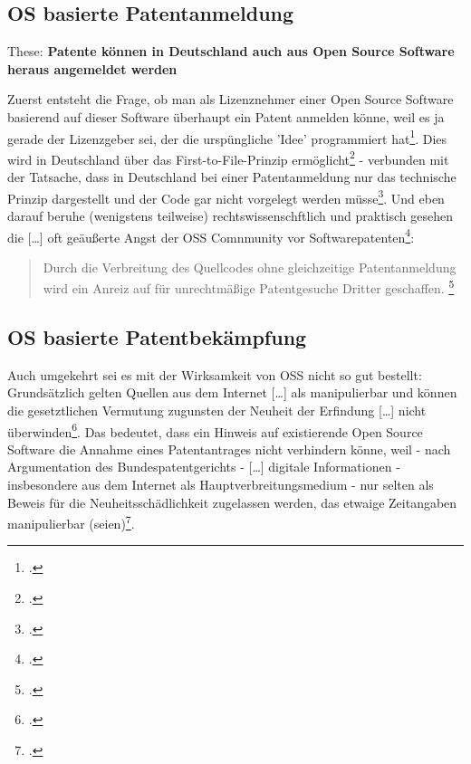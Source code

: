 \documentclass[DIV=calc,BCOR=5mm,11pt,headings=small,oneside,abstract=true, toc=bib]{scrartcl}
\begin{document}
\subsection{OS basierte Patentanmeldung}

These: \textbf{Patente können in Deutschland auch aus Open Source Software
heraus angemeldet werden}

Zuerst entsteht die Frage, ob man als Lizenznehmer einer Open Source Software
basierend auf dieser Software überhaupt ein Patent anmelden könne, weil es ja
gerade der Lizenzgeber sei, der die urspüngliche 'Idee' programmiert
hat\footcite[vgl.][21]{Suchomski2011a}. Dies wird in Deutschland über das
\glqq{}First-to-File-Prinzip\grqq{}
ermöglicht\footcite[vgl.][21]{Suchomski2011a} - verbunden mit der Tatsache, dass
in Deutschland bei einer Patentanmeldung nur das technische Prinzip dargestellt
und der Code gar nicht vorgelegt werden
müsse\footcite[vgl.][26]{Suchomski2011a}. Und eben darauf beruhe (wenigstens
teilweise) \glqq{}rechtswissenschftlich und praktisch\grqq{} gesehen die
\glqq{}[\ldots] oft geäußerte Angst der OSS Comnmunity vor
Softwarepatenten\grqq{}\footcite[vgl.][27]{Suchomski2011a}: 

\begin{quote}
\glqq{}Durch die Verbreitung des Quellcodes ohne gleichzeitige Patentanmeldung
wird ein Anreiz auf für unrechtmäßige Patentgesuche Dritter geschaffen.
\grqq{}\footcite[vgl.][27]{Suchomski2011a}
\end{quote}

\subsection{OS basierte Patentbekämpfung}
Auch umgekehrt sei es mit der Wirksamkeit von OSS nicht so gut bestellt:
Grundsätzlich gelten \glqq{}Quellen aus dem Internet [\ldots] als
manipulierbar und können die gesetztlichen Vermutung zugunsten der
Neuheit der Erfindung [\ldots] nicht
überwinden\grqq{}\footcite[vgl.][27]{Suchomski2011a}. Das bedeutet, dass ein
Hinweis auf existierende Open Source Software die Annahme eines Patentantrages
nicht verhindern könne, weil - nach Argumentation des Bundespatentgerichts -
\glqq{}[\ldots] digitale Informationen - insbesondere aus dem Internet
als Hauptverbreitungsmedium - nur selten als Beweis für die
Neuheitsschädlichkeit zugelassen werden, das etwaige Zeitangaben
manipulierbar (seien)\grqq{}\footcite[vgl.][33]{Suchomski2011a}.
\end{document}
